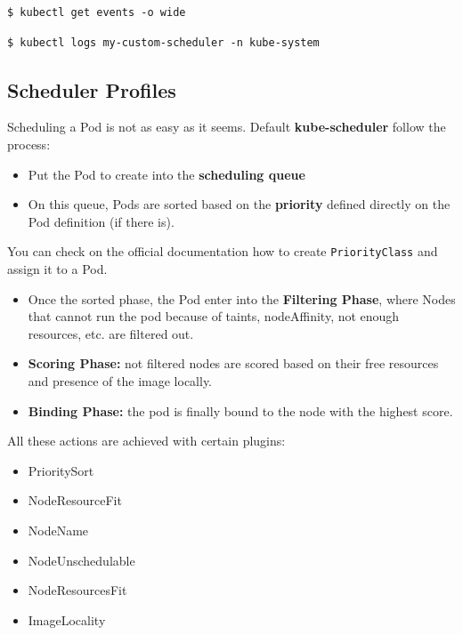 \documentclass{article}
\newenvironment{blocktemplateI}[1]{%
    \tcolorbox[beamer,%
    noparskip,breakable,
    colframe=Violet,%
    colbacklower=Black,%
    title=#1]}%
    {\endtcolorbox}
\newenvironment{codetemplate}[1][]{%
  \mybasecolorbox[#1]
  \itshape
}{%
  \endmybasecolorbox
}
\begin{document}
\begin{codetemplate}{}
\begin{verbatim}
$ kubectl get events -o wide
\end{verbatim}
\end{codetemplate}

\begin{codetemplate}{}
\begin{verbatim}
$ kubectl logs my-custom-scheduler -n kube-system
\end{verbatim}
\end{codetemplate}

\subsection{Scheduler Profiles}

Scheduling a Pod is not as easy as it seems. Default \textbf{kube-scheduler} follow the process:
\begin{itemize}
    \item Put the Pod to create into the \textbf{scheduling queue}
    \item On this queue, Pods are sorted based on the \textbf{priority} defined directly on the Pod definition (if there is).
\end{itemize}

\begin{blocktemplateI}{NOTE}
You can check on the official documentation how to create \verb|PriorityClass| and assign it to a Pod.
\end{blocktemplateI}

\begin{itemize}
    \item Once the sorted phase, the Pod enter into the \textbf{Filtering Phase}, where Nodes that cannot run the pod because of taints, nodeAffinity, not enough resources, etc. are filtered out.
    \item \textbf{Scoring Phase:} not filtered nodes are scored based on their free resources and presence of the image locally.
    \item \textbf{Binding Phase:} the pod is finally bound to the node with the highest score.
\end{itemize}

All these actions are achieved with certain plugins:
\begin{itemize}
    \item PrioritySort
    \item NodeResourceFit
    \item NodeName
    \item NodeUnschedulable
    \item NodeResourcesFit
    \item ImageLocality
\end{itemize}
\end{document}
